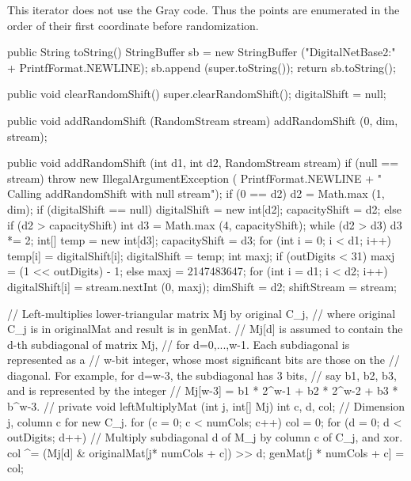 \begin{tabb}
  This iterator does not use the
  Gray code. Thus the points are enumerated in the order of their first
  coordinate before randomization.
\end{tabb}
\begin{code}\begin{hide}

   public String toString() {
      StringBuffer sb = new StringBuffer ("DigitalNetBase2:" +
                              PrintfFormat.NEWLINE);
      sb.append (super.toString());
      return sb.toString();
   }

   public void clearRandomShift() {
      super.clearRandomShift();
      digitalShift = null;
   }

   public void addRandomShift (RandomStream stream) {
      addRandomShift (0, dim, stream);
   }

   public void addRandomShift (int d1, int d2, RandomStream stream) {
      if (null == stream)
         throw new IllegalArgumentException (
              PrintfFormat.NEWLINE +
                 "   Calling addRandomShift with null stream");
      if (0 == d2)
         d2 = Math.max (1, dim);
      if (digitalShift == null) {
         digitalShift = new int[d2];
         capacityShift = d2;
      } else if (d2 > capacityShift) {
         int d3 = Math.max (4, capacityShift);
         while (d2 > d3)
            d3 *= 2;
         int[] temp = new int[d3];
         capacityShift = d3;
         for (int i = 0; i < d1; i++)
            temp[i] = digitalShift[i];
         digitalShift = temp;
      }
      int maxj;
      if (outDigits < 31)
         maxj = (1 << outDigits) - 1;
      else
         maxj = 2147483647;
      for (int i = d1; i < d2; i++)
         digitalShift[i] = stream.nextInt (0, maxj);
      dimShift = d2;
      shiftStream = stream;
   }


   // Left-multiplies lower-triangular matrix Mj by original C_j,
   // where original C_j is in originalMat and result is in genMat.
   // Mj[d] is assumed to contain the d-th subdiagonal of matrix Mj,
   // for d=0,...,w-1. Each subdiagonal is represented as a
   // w-bit integer, whose most significant bits are those on the
   // diagonal. For example, for d=w-3, the subdiagonal has 3 bits,
   // say b1, b2, b3, and is represented by the integer
   // Mj[w-3] = b1 * 2^{w-1} + b2 * 2^{w-2} + b3 * b^{w-3}.
   //
   private void leftMultiplyMat (int j, int[] Mj) {
      int c, d, col;       // Dimension j, column c for new C_j.
      for (c = 0; c < numCols; c++) {
         col = 0;
         for (d = 0; d < outDigits; d++)
            // Multiply subdiagonal d of M_j by column c of C_j, and xor.
            col ^= (Mj[d] & originalMat[j* numCols + c]) >> d;
         genMat[j * numCols + c] = col;
      }
   }


\end{hide}
\end{code}

